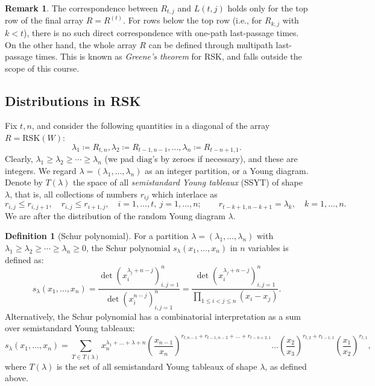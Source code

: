 \documentclass[letterpaper,11pt,oneside,reqno]{article}
\numberwithin{equation}{section}
\theoremstyle{definition}
\newtheorem{definition}[proposition]{Definition}
\newtheorem{remark}[proposition]{Remark}
\begin{document}
\begin{remark}
	The correspondence between $R_{t,j}$ and $L(t,j)$
	holds only for the top row of the final array
	$R=R^{(t)}$. For rows below the top row (i.e., for
	$R_{k,j}$ with $k < t$), there is no such direct
	correspondence with one-path last-passage times.
	On the other hand, the whole array $R$ can be defined
	through multipath last-passage times. This is
	known as \emph{Greene's theorem} \cite{sagan2001symmetric} for RSK,
	and falls outside the scope of this course.
\end{remark}

\subsection{Distributions in RSK}
\label{sub:distribution_RSK}

Fix $t,n$, and consider the following quantities
in a diagonal of the array $R=\mathrm{RSK}(W)$:
\begin{equation*}
	\lambda_1\coloneqq R_{t,n},
	\lambda_2\coloneqq R_{t-1,n-1},\ldots,
	\lambda_n\coloneqq R_{t-n+1,1}.
\end{equation*}
Clearly, $\lambda_1\ge\lambda_2\ge\cdots\ge\lambda_n$ (we pad $\mathrm{diag}$'s by zeroes if necessary),
and these are integers. We regard $\lambda=(\lambda_1,\ldots,\lambda_n)$ as an integer partition,
or a Young diagram.
Denote by $T(\lambda)$ the
space of all \emph{semistandard Young tableaux} (SSYT) of shape $\lambda$, that is,
all collections of numbers $r_{ij}$ which interlace as
\begin{equation*}
	r_{i,j}\le r_{i,j+1},\quad r_{i,j}\le r_{i+1,j},
	\quad
	i=1,\ldots,t,\ j=1,\ldots,n;
	\qquad
	r_{t-k+1,n-k+1}=\lambda_k,\quad k=1,\ldots,n.
\end{equation*}
We are after the distribution of the random Young diagram $\lambda$.

\begin{definition}[Schur polynomial]
	For a partition $\lambda=(\lambda_1,\ldots,\lambda_n)$ with $\lambda_1 \geq \lambda_2 \geq \cdots \geq \lambda_n \geq 0$, the Schur polynomial $s_\lambda(x_1,\ldots,x_n)$ in $n$ variables is defined as:
	\begin{equation}
		\label{eq:Schur_polynomial}
		s_\lambda(x_1,\ldots,x_n) =
		\frac{\det(x_i^{\lambda_j+n-j})_{i,j=1}^n}{\det(x_i^{n-j})_{i,j=1}^n}
		= \frac{\det(x_i^{\lambda_j+n-j})_{i,j=1}^n}{\prod_{1
		\leq i < j \leq n}(x_i-x_j)}.
	\end{equation}
	Alternatively, the Schur polynomial has a combinatorial interpretation as a sum over semistandard Young tableaux:
	\begin{equation}
		\label{eq:Schur_polynomial_combinatorial}
		s_\lambda(x_1,\ldots,x_n) = \sum_{T \in T(\lambda)}
		x_n^{\lambda_1+\ldots+\lambda+n }
		\left( \frac{x_{n-1}}{x_n} \right)^{r_{t,n-1}+r_{t-1,n-2}+\ldots+r_{t-n+2,1} }
		\ldots
		\left( \frac{x_2}{x_3} \right)^{r_{t,2}+r_{t-1,1}}
		\left( \frac{x_1}{x_2} \right)^{r_{t,1}},
	\end{equation}
	where $T(\lambda)$ is the set of all semistandard Young tableaux of shape $\lambda$,
	as defined above.
\end{definition}
\end{document}
